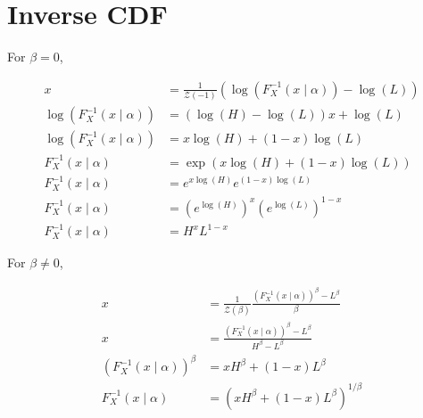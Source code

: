 \documentclass{article}
\newcommand{\Z}{\mathcal{Z}}
\newcommand{\Log}[1]{\log{\left(#1\right)}}
\begin{document}
\section{Inverse CDF}

For $\beta=0$,

\begin{align}
    x                             & = \frac{1}{\Z(-1)} \left(\Log{F_{X}^{-1}(x\mid\alpha)} - \Log{L}\right) \\
    \Log{F_{X}^{-1}(x\mid\alpha)} & = (\Log{H} - \Log{L})x + \Log{L}                                        \\
    \Log{F_{X}^{-1}(x\mid\alpha)} & = x\Log{H} + (1-x)\Log{L}                                               \\
    F_{X}^{-1}(x\mid\alpha)       & = \exp{\left(x\Log{H} + (1-x)\Log{L}\right)}                            \\
    F_{X}^{-1}(x\mid\alpha)       & = e^{x\Log{H}}e^{(1-x)\Log{L}}                                          \\
    F_{X}^{-1}(x\mid\alpha)       & = \left(e^{\Log{H}}\right)^{x}{\left(e^{\Log{L}}\right)}^{1-x}          \\
    F_{X}^{-1}(x\mid\alpha)       & = H^{x}L^{1-x}
\end{align}

For $\beta\neq0$,

\begin{align}
    x                                              & = \frac{1}{\Z(\beta)}\frac{{\left(F_{X}^{-1}(x\mid\alpha)\right)}^{\beta} - L^{\beta}}{\beta} \\
    x                                              & = \frac{{\left(F_{X}^{-1}(x\mid\alpha)\right)}^{\beta} - L^{\beta}}{H^{\beta} - L^{\beta}}    \\
    {\left(F_{X}^{-1}(x\mid\alpha)\right)}^{\beta} & = xH^{\beta} + (1-x) L^{\beta}                                                                \\
    F_{X}^{-1}(x\mid\alpha)                        & = \left(xH^{\beta} + (1-x) L^{\beta}\right)^{1/\beta}
\end{align}
\end{document}
